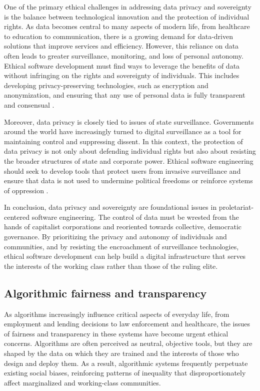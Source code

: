 \begin{refsection}
One of the primary ethical challenges in addressing data privacy and sovereignty is the balance between technological innovation and the protection of individual rights. As data becomes central to many aspects of modern life, from healthcare to education to communication, there is a growing demand for data-driven solutions that improve services and efficiency. However, this reliance on data often leads to greater surveillance, monitoring, and loss of personal autonomy. Ethical software development must find ways to leverage the benefits of data without infringing on the rights and sovereignty of individuals. This includes developing privacy-preserving technologies, such as encryption and anonymization, and ensuring that any use of personal data is fully transparent and consensual \cite[pp.~104-106]{benkler2010}.

Moreover, data privacy is closely tied to issues of state surveillance. Governments around the world have increasingly turned to digital surveillance as a tool for maintaining control and suppressing dissent. In this context, the protection of data privacy is not only about defending individual rights but also about resisting the broader structures of state and corporate power. Ethical software engineering should seek to develop tools that protect users from invasive surveillance and ensure that data is not used to undermine political freedoms or reinforce systems of oppression \cite[pp.~92-94]{noble2018}.

In conclusion, data privacy and sovereignty are foundational issues in proletariat-centered software engineering. The control of data must be wrested from the hands of capitalist corporations and reoriented towards collective, democratic governance. By prioritizing the privacy and autonomy of individuals and communities, and by resisting the encroachment of surveillance technologies, ethical software development can help build a digital infrastructure that serves the interests of the working class rather than those of the ruling elite.

\subsection{Algorithmic fairness and transparency}

As algorithms increasingly influence critical aspects of everyday life, from employment and lending decisions to law enforcement and healthcare, the issues of fairness and transparency in these systems have become urgent ethical concerns. Algorithms are often perceived as neutral, objective tools, but they are shaped by the data on which they are trained and the interests of those who design and deploy them. As a result, algorithmic systems frequently perpetuate existing social biases, reinforcing patterns of inequality that disproportionately affect marginalized and working-class communities.


\end{refsection}
